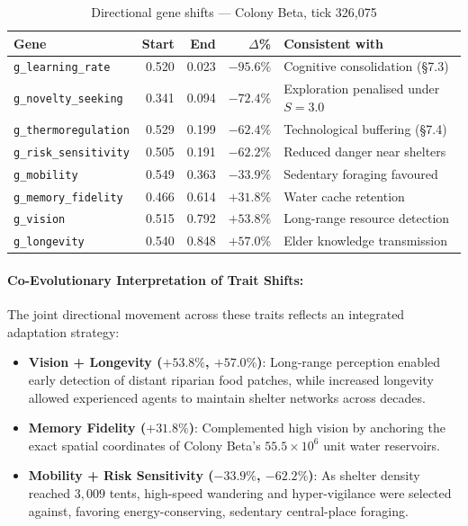 \documentclass[12pt,a4paper]{article}
\begin{document}
\begin{table}[h]
\centering
\caption{Directional gene shifts --- Colony Beta, tick 326,075}
\label{tab:genes}
\begin{tabularx}{\linewidth}{l r r r X}
\toprule
\textbf{Gene} & \textbf{Start} & \textbf{End} & \textbf{$\Delta$\%} & \textbf{Consistent with} \\
\midrule
\texttt{g\_learning\_rate} & 0.520 & 0.023 & $-95.6\%$ & Cognitive consolidation (\S7.3) \\
\texttt{g\_novelty\_seeking} & 0.341 & 0.094 & $-72.4\%$ & Exploration penalised under $S{=}3.0$ \\
\texttt{g\_thermoregulation} & 0.529 & 0.199 & $-62.4\%$ & Technological buffering (\S7.4) \\
\texttt{g\_risk\_sensitivity} & 0.505 & 0.191 & $-62.2\%$ & Reduced danger near shelters \\
\texttt{g\_mobility} & 0.549 & 0.363 & $-33.9\%$ & Sedentary foraging favoured \\
\texttt{g\_memory\_fidelity} & 0.466 & 0.614 & $+31.8\%$ & Water cache retention \\
\texttt{g\_vision} & 0.515 & 0.792 & $+53.8\%$ & Long-range resource detection \\
\texttt{g\_longevity} & 0.540 & 0.848 & $+57.0\%$ & Elder knowledge transmission \\
\bottomrule
\end{tabularx}
\end{table}

\paragraph{Co-Evolutionary Interpretation of Trait Shifts:}
The joint directional movement across these traits reflects an integrated adaptation strategy:
\begin{itemize}[noitemsep]
  \item \textbf{Vision + Longevity ($+53.8\%$, $+57.0\%$)}: Long-range perception enabled early detection of distant riparian food patches, while increased longevity allowed experienced agents to maintain shelter networks across decades.
  \item \textbf{Memory Fidelity ($+31.8\%$)}: Complemented high vision by anchoring the exact spatial coordinates of Colony Beta's $55.5\times 10^6$ unit water reservoirs.
  \item \textbf{Mobility + Risk Sensitivity ($-33.9\%$, $-62.2\%$)}: As shelter density reached $3,009$ tents, high-speed wandering and hyper-vigilance were selected against, favoring energy-conserving, sedentary central-place foraging.
\end{itemize}
\end{document}
